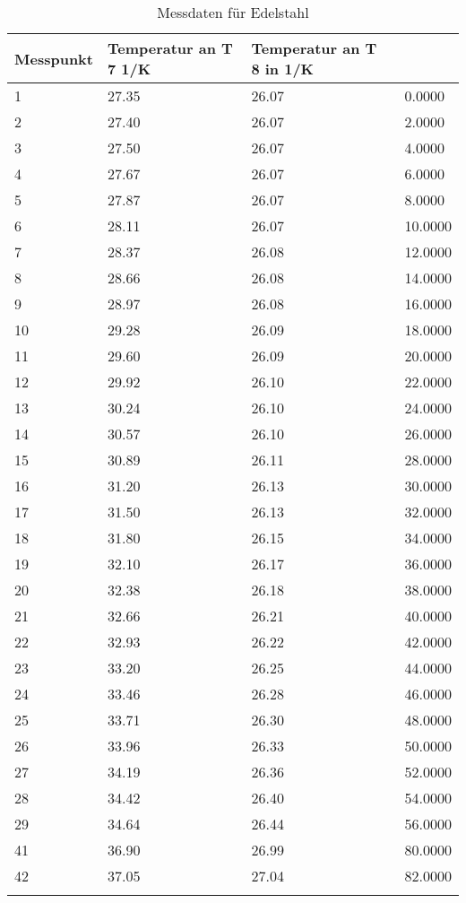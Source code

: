 \documentclass[
  captions=tableheading,
]{scrartcl}
\begin{document}
\begin{longtable} {l|l|l|l}

  \caption{Messdaten für Edelstahl}

  \label{tab:Messdaten2}

\hline
    {\bf Messpunkt} & {\bf Temperatur an T 7 1/K} & {\bf Temperatur an T 8 in 1/K} &  {\bf Zeit in 1/s\\



\midrule
1 &	27.35 &	26.07 &	0.0000\\
2 &	27.40 &	26.07 &	2.0000\\
3 &	27.50 &	26.07 &	4.0000\\
4 &	27.67 &	26.07 &	6.0000\\
5 &	27.87 &	26.07 &	8.0000\\
6 &	28.11 &	26.07 &	10.0000\\
7 &	28.37 &	26.08 &	12.0000\\
8 &	28.66 &	26.08 &	14.0000\\
9 &	28.97 &	26.08 &	16.0000\\
10	& 29.28	&26.09	&18.0000\\
11	& 29.60	&26.09	&20.0000\\
12	& 29.92	&26.10	&22.0000\\
13	& 30.24	&26.10	&24.0000\\
14	& 30.57	&26.10	&26.0000\\
15	& 30.89	&26.11	&28.0000\\
16	& 31.20	&26.13	&30.0000\\
17	& 31.50	&26.13	&32.0000\\
18 & 31.80	&26.15	&34.0000\\
19	& 32.10	&26.17	&36.0000\\
20	& 32.38	&26.18	&38.0000\\
21 & 32.66 &26.21 &40.0000\\
22	& 32.93	&26.22	&42.0000\\
23	& 33.20	&26.25	&44.0000\\
24	& 33.46	&26.28	&46.0000\\
25	& 33.71	&26.30	&48.0000\\
26	& 33.96	&26.33	&50.0000\\
27	& 34.19	&26.36	&52.0000\\
28	& 34.42	&26.40	&54.0000\\
29	& 34.64	&26.44	&56.0000\\
41	& 36.90	& 26.99	& 80.0000\\
42	& 37.05	& 27.04	& 82.0000\\
}
\end{longtable}
\end{document}
